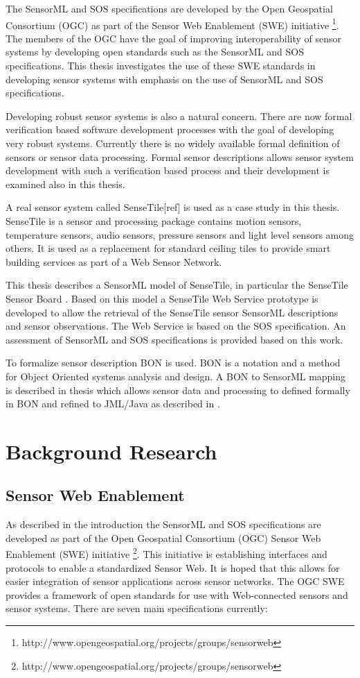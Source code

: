 \documentclass[]{final_report}
\begin{document}
The SensorML and SOS specifications are developed by the Open Geospatial Consortium (OGC) as part of the Sensor Web Enablement (SWE) initiative \footnote{http://www.opengeospatial.org/projects/groups/sensorweb}. The members of the OGC have the goal of improving interoperability of sensor systems by developing open standards such as the SensorML and SOS specifications. This thesis investigates the use of these SWE standards in developing sensor systems with emphasis on the use of SensorML and SOS specifications.

Developing robust sensor systems is also a natural concern. There are now formal verification based software development processes \cite{Kiniryref} with the goal of developing very robust systems.  Currently there is no widely available formal definition of sensors or sensor data processing. Formal sensor descriptions allows sensor system development with such a verification based process and their development is examined also in this thesis.

A real sensor system called SenseTile[ref] is used as a case study in this thesis. SenseTile is a sensor and processing package contains motion sensors, temperature sensors, audio sensors, pressure sensors and light level sensors among others. It is used as a replacement for standard ceiling tiles to provide smart building services as part of a Web Sensor Network.

This thesis describes a  SensorML model of SenseTile, in particular the SenseTile Sensor Board . Based on this model a SenseTile Web Service prototype is developed to allow the retrieval of the SenseTile sensor SensorML descriptions and sensor observations. The Web Service is based on the SOS specification. An assessment of SensorML and SOS specifications is provided based on this work.

To formalize sensor description BON\cite{BONref} is used. BON is a notation and a method for Object Oriented systems analysis and design. A BON to SensorML mapping is described in thesis which allows sensor data and processing to defined formally in BON and refined to JML/Java as described in \cite{Kiniryref}.


\chapter{ Background Research}

\section{Sensor Web Enablement}\label{SWESec}
As described in the introduction the SensorML and SOS specifications are developed as part of the Open Geospatial Consortium (OGC) Sensor Web Enablement (SWE) initiative \footnote{http://www.opengeospatial.org/projects/groups/sensorweb}. This initiative is establishing interfaces and protocols to enable a standardized Sensor Web. It is hoped that this allows for easier integration of sensor applications across sensor networks. The OGC SWE provides a framework of open standards for use with Web-connected sensors and sensor systems. There are seven main specifications currently:
\end{document}
